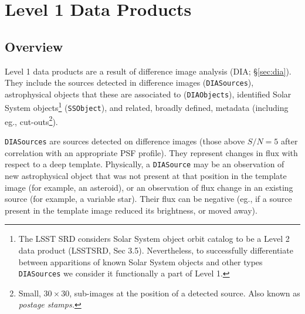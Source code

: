 \documentclass[12pt]{article}
\newcommand{\code}[1]{\texttt{#1}}
\newcommand{\DIASource}{\code{DIASource}\xspace}
\newcommand{\DIASources}{\code{DIASources}\xspace}
\newcommand{\DIAObjects}{\code{DIAObjects}\xspace}
\newcommand{\SSObject}{\code{SSObject}\xspace}
\begin{document}


\section{Level 1 Data Products}

\subsection{Overview}

Level 1 data products are a result of difference image analysis (DIA; \S \ref{sec:dia}). They include the sources detected in difference images (\DIASources), astrophysical objects that these are associated to (\DIAObjects), identified Solar System objects\footnote{The LSST SRD considers Solar System object orbit catalog to be a Level 2 data product (LSSTSRD, Sec 3.5). Nevertheless, to successfully differentiate between apparitions of known Solar System objects and other types \DIASources we consider it functionally a part of Level 1.} (\SSObject), and related, broadly defined, metadata (including eg., cut-outs\footnote{Small, $30 \times 30$, sub-images at the position of a detected source. Also known as {\em postage stamps.}}).

\DIASources are sources detected on difference images (those above $S/N=5$ after correlation with an appropriate PSF profile). They represent changes in flux with respect to a deep template. Physically, a \DIASource may be an observation of new astrophysical object that was not present at that position in the template image (for example, an asteroid), or an observation of flux change in an existing source (for example, a variable star). Their flux can be negative (eg., if a source present in the template image reduced its brightness, or moved away).
\end{document}
